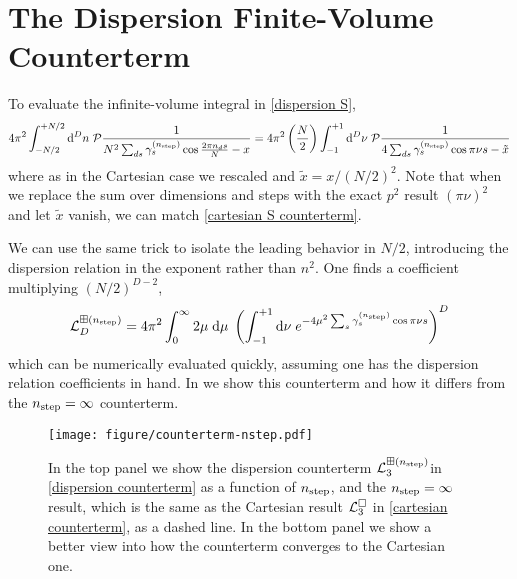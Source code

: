 \section{The Dispersion \Luscher Finite-Volume Counterterm}\label{sec:counterterm/dispersion}

To evaluate the infinite-volume integral in \eqref{dispersion S},
\begin{equation}
    4\pi^2 \int_{-N/2}^{+N/2} \mathrm{d}^Dn\; \mathcal{P} \frac{1}{N^2 \sum_{ds} \gamma^{({n_\text{step}})}_s \cos \frac{2\pi n_d s}{N} - x}
    =
    4\pi^2 \left(\frac{N}{2}\right) \int_{-1}^{+1} \mathrm{d}^D\nu\; \mathcal{P} \frac{1}{4\sum_{ds} \gamma^{({n_\text{step}})}_s \cos \pi \nu s - \tilde{x}}
\end{equation}
where as in the Cartesian case we rescaled and $\tilde{x} = x/(N/2)^2$.
Note that when we replace the sum over dimensions and steps with the exact $p^2$ result $(\pi \nu)^2$ and let $\tilde{x}$ vanish, we can match \eqref{cartesian S counterterm}.

We can use the same trick to isolate the leading behavior in $N/2$, introducing the dispersion relation in the exponent rather than $n^2$.
One finds a coefficient multiplying $(N/2)^{D-2}$,
\begin{equation}
    \label{eq:dispersion counterterm}
    \mathcal{L}^{\boxplus ({n_\text{step}})}_D = 4 \pi^2 \int_{0}^{\infty} 2\mu\; \mathrm{d}\mu\; \left(\int_{-1}^{+1} \mathrm{d}\nu\; e^{-4\mu^2 \sum_s \gamma_s^{({n_\text{step}})} \cos \pi \nu s}\right)^D
\end{equation}
which can be numerically evaluated quickly, assuming one has the dispersion relation coefficients in hand.
In  we show this counterterm and how it differs from the ${n_\text{step}}=\infty$ counterterm.

\begin{figure}
    \texttt{[image: figure/counterterm-nstep.pdf]}
    \caption{In the top panel we show the dispersion counterterm $\mathcal{L}^{\boxplus ({n_\text{step}})}_{3}$in \eqref{dispersion counterterm} as a function of ${n_\text{step}}$, and the ${n_\text{step}}=\infty$ result, which is the same as the Cartesian result $\mathcal{L}^{\square}_3$ in \eqref{cartesian counterterm}, as a dashed line.  In the bottom panel we show a better view into how the counterterm converges to the Cartesian one.
    }
    \label{fig:nstep counterterm}
\end{figure}
